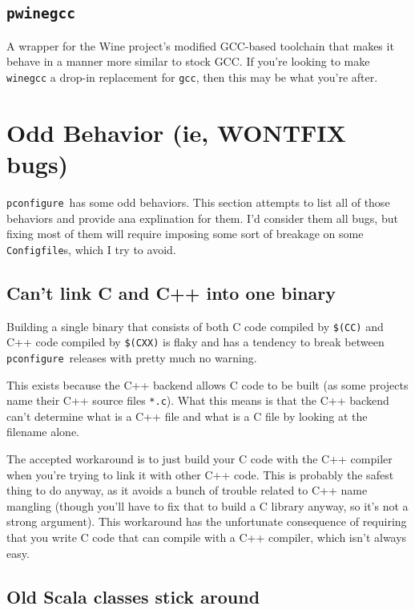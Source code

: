 \documentclass{article}
\newcommand{\pconfigure}{\texttt{pconfigure}}
\begin{document}
\subsection{\texttt{pwinegcc} \label{prog:pwinegcc}}

A wrapper for the Wine project's modified GCC-based toolchain that
makes it behave in a manner more similar to stock GCC.  If you're
looking to make \texttt{winegcc} a drop-in replacement for
\texttt{gcc}, then this may be what you're after.

\section{Odd Behavior (ie, WONTFIX bugs) \label{odd}}

\pconfigure\ has some odd behaviors.  This section attempts to list
all of those behaviors and provide ana explination for them.  I'd
consider them all bugs, but fixing most of them will require imposing
some sort of breakage on some \texttt{Configfile}s, which I try to
avoid.

\subsection{Can't link C and C++ into one binary}

Building a single binary that consists of both C code compiled by
\texttt{\$(CC)} and C++ code compiled by \texttt{\$(CXX)} is flaky and
has a tendency to break between \pconfigure\ releases with pretty much
no warning.

This exists because the C++ backend allows C code to be built (as some
projects name their C++ source files \texttt{*.c}).  What this means
is that the C++ backend can't determine what is a C++ file and what is
a C file by looking at the filename alone.

The accepted workaround is to just build your C code with the C++
compiler when you're trying to link it with other C++ code.  This is
probably the safest thing to do anyway, as it avoids a bunch of
trouble related to C++ name mangling (though you'll have to fix that
to build a C library anyway, so it's not a strong argument).  This
workaround has the unfortunate consequence of requiring that you write
C code that can compile with a C++ compiler, which isn't always easy.

\subsection{Old Scala classes stick around}
\end{document}

